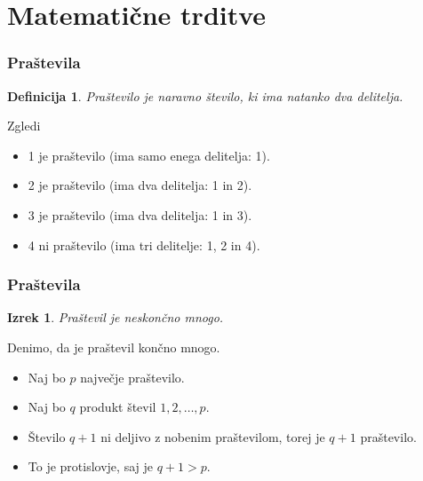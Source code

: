 \documentclass{beamer}
\newtheorem{izrek}{Izrek}
\newtheorem{definicija}{Definicija}
\begin{document}

\section{Matematične trditve}


   
   \begin{frame}
      \frametitle{Praštevila}
        
        \begin{definicija}
            Praštevilo je naravno število, ki ima natanko dva delitelja.
        \end{definicija}

\begin{exampleblock}{Zgledi}                        
               \begin{itemize}
                  \item 1 je praštevilo (ima samo enega delitelja: 1).
                  \item 2 je praštevilo (ima dva delitelja: 1 in 2).
                  \item 3 je praštevilo (ima dva delitelja: 1 in 3).
                  \item 4 ni praštevilo (ima tri delitelje: 1, 2 in 4).
               \end{itemize}
\end{exampleblock}
   \end{frame}



\begin{frame}
      \frametitle{Praštevila}
         
         \begin{izrek}
            Praštevil je neskončno mnogo.
         \end{izrek}
         
         \begin{block}
            Denimo, da je praštevil končno mnogo.               
               \begin{itemize}
                  \item Naj bo $p$ največje praštevilo.
                  \item Naj bo $q$ produkt števil $1, 2, \ldots, p$.
                  \item Število $q+1$ ni deljivo z nobenim praštevilom, torej je $q+1$ praštevilo.
                  \item To je protislovje, saj je $q+1>p$.
               \end{itemize}
         \end{block}
\end{frame}
\end{document}
